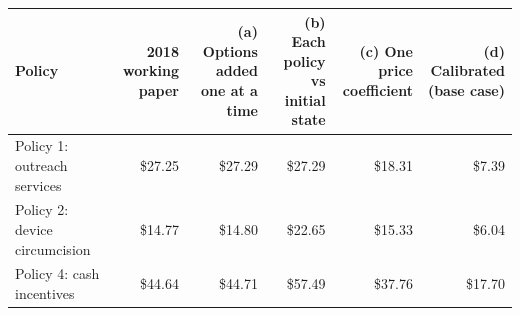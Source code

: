 \begin{tabular}{>{\raggedright\arraybackslash}p{3.0cm}rrrrr}
\toprule
Policy & \makecell{2018 working\\paper} & \makecell{(a) Options added\\one at a time} & \makecell{(b) Each policy vs\\initial state} & \makecell{(c) One price\\coefficient} & \makecell{(d) Calibrated\\(base case)}
\\
\midrule
Policy 1: outreach services & \$27.25 & \$27.29 & \$27.29 & \$18.31 & \$7.39 \\
Policy 2: device circumcision & \$14.77 & \$14.80 & \$22.65 & \$15.33 & \$6.04 \\
Policy 4: cash incentives & \$44.64 & \$44.71 & \$57.49 & \$37.76 & \$17.70 \\
\bottomrule
\end{tabular}
